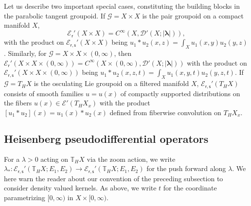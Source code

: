 \documentclass[a4paper,reqno]{amsart}
\numberwithin{equation}{section}
\theoremstyle{definition}
\theoremstyle{remark}
\begin{document}
Let us describe two important special cases, constituting the building blocks in the parabolic tangent groupoid. If $\mathcal{G}=X\times X$ is the pair groupoid on a compact manifold $X$, 
$$\mathcal{E}_\mathsf{r}'(X\times X)=C^\infty(X,\mathcal{D}'(X;|\pmb{\lambda}|)),$$
with the product on $\mathcal{E}_{\mathsf{r},\mathsf{s}}'(X\times X)$ being $u_1*u_2(x,z)=\int_X u_1(x,y)u_2(y,z)$. Similarly, for $\mathcal{G}=X\times X\times (0,\infty)$, then $\mathcal{E}_\mathsf{r}'(X\times X\times (0,\infty))=C^\infty(X\times (0,\infty),\mathcal{D}'(X;|\pmb{\lambda}|))$ with the product on $\mathcal{E}_{\mathsf{r},\mathsf{s}}'(X\times X\times (0,\infty))$ being $u_1*u_2(x,z,t)=\int_X u_1(x,y,t)u_2(y,z,t)$. If $\mathcal{G}=T_HX$ is the osculating Lie groupoid on a filtered manifold $X$, $\mathcal{E}_{\mathsf{r},\mathsf{s}}'(T_HX)$ consists of smooth families $u=u(x)$ of compactly supported distributions on the fibers $u(x)\in \mathcal{E}'(T_HX_x)$ with the product $[u_1*u_2](x)=u_1(x)*u_2(x)$ defined from fiberwise convolution on $T_HX_x$.



\subsection{Heisenberg pseudodifferential operators}

For a $\lambda>0$ acting on $\mathbb{T}_HX$ via the zoom action, we write $\lambda_*: \mathcal{E}_{\mathsf{r},\mathsf{s}}'(\mathbb{T}_HX;E_1,E_2)\to  \mathcal{E}_{\mathsf{r},\mathsf{s}}'(\mathbb{T}_HX;E_1,E_2)$ for the push forward along $\lambda$. We here warn the reader about our convention of the preceding subsection to consider density valued kernels. As above, we write $t$ for the coordinate parametrizing $[0,\infty)$ in $X\times [0,\infty)$.
\end{document}
